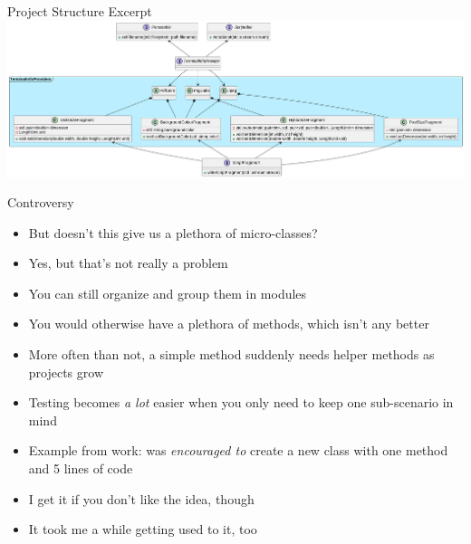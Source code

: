 
\begin{frame}{Project Structure Excerpt}
%
\includegraphics[width=\linewidth]{./gfx/16-uml-fragments}
%
\end{frame}


\begin{frame}{Controversy}
%
\begin{itemize}
\item But doesn't this give us a plethora of micro-classes?
	\pause
\item Yes, but that's not really a problem
\item You can still organize and group them in modules
\item You would otherwise have a plethora of methods, which isn't any better
\item More often than not, a simple method suddenly needs helper methods as projects grow
\item Testing becomes \emph{a lot} easier when you only need to keep one sub-scenario in mind
	\pause
\item Example from work: was \emph{encouraged to} create a new class with one method and 5 lines of code
	\pause
\item I get it if you don't like the idea, though
\item It took me a while getting used to it, too
\end{itemize}
%
\end{frame}


